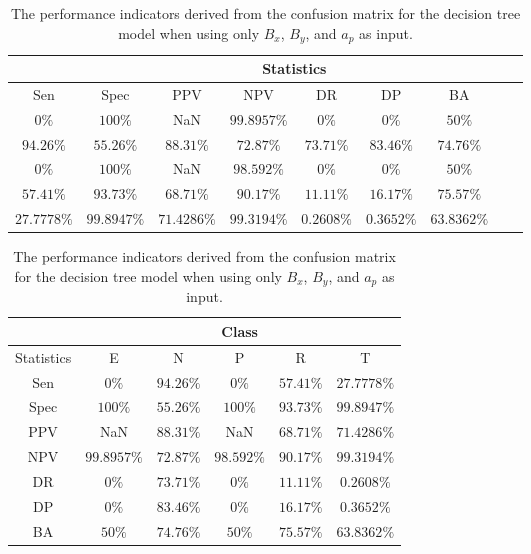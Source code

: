 \begin{table}[!ht]
	\centering
	\begin{tabular}{|c|c|c|c|c|c|c|c|c|}
		\hline
		 & \multicolumn{7}{c|}{Statistics} \\ \hline
		Sen & Spec & PPV & NPV & DR & DP & BA \\ \hline
		$0\%$ & $100\%$ & NaN & $99.8957\%$ & $0\%$ & $0\%$ & $50\%$ \\ \hline
		$94.26\%$ & $55.26\%$ & $88.31\%$ & $72.87\%$ & $73.71\%$ & $83.46\%$ & $74.76\%$ \\ \hline
		$0\%$ & $100\%$ & NaN & $98.592\%$ & $0\%$ & $0\%$ & $50\%$ \\ \hline
		$57.41\%$ & $93.73\%$ & $68.71\%$ & $90.17\%$ & $11.11\%$ & $16.17\%$ & $75.57\%$ \\ \hline
		$27.7778\%$ & $99.8947\%$ & $71.4286\%$ & $99.3194\%$ & $0.2608\%$ & $0.3652\%$ & $63.8362\%$ \\ \hline
	\end{tabular}
	\caption{The performance indicators derived from the confusion matrix for the decision tree model when using only $B_{x}$, $B_{y}$, and $a_{p}$ as input.}
	\label{tab:cs:xyap:C5.0}
\end{table}

\begin{table}[!ht]
	\centering
	\begin{tabular}{|c|c|c|c|c|c|}
		\hline
		 & \multicolumn{5}{c|}{Class} \\ \hline
		Statistics & E & N & P & R & T \\ \hline
		Sen & $0\%$ & $94.26\%$ & $0\%$ & $57.41\%$ & $27.7778\%$ \\ \hline
		Spec & $100\%$ & $55.26\%$ & $100\%$ & $93.73\%$ & $99.8947\%$ \\ \hline
		PPV & NaN & $88.31\%$ & NaN & $68.71\%$ & $71.4286\%$ \\ \hline
		NPV & $99.8957\%$ & $72.87\%$ & $98.592\%$ & $90.17\%$ & $99.3194\%$ \\ \hline
		DR & $0\%$ & $73.71\%$ & $0\%$ & $11.11\%$ & $0.2608\%$ \\ \hline
		DP & $0\%$ & $83.46\%$ & $0\%$ & $16.17\%$ & $0.3652\%$ \\ \hline
		BA & $50\%$ & $74.76\%$ & $50\%$ & $75.57\%$ & $63.8362\%$ \\ \hline
	\end{tabular}
	\caption{The performance indicators derived from the confusion matrix for the decision tree model when using only $B_{x}$, $B_{y}$, and $a_{p}$ as input.}
	\label{tab:cs:reverse:xyap:C5.0}
\end{table}

